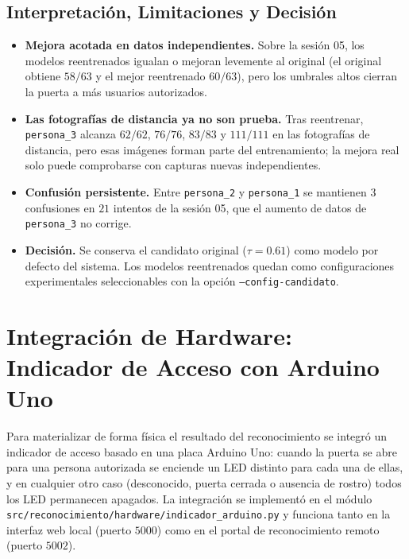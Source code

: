 \documentclass{article}
\begin{document}
\subsection{Interpretación, Limitaciones y Decisión}
\begin{itemize}
    \item \textbf{Mejora acotada en datos independientes.} Sobre la sesión 05, los modelos reentrenados igualan o mejoran levemente al original (el original obtiene $58/63$ y el mejor reentrenado $60/63$), pero los umbrales altos cierran la puerta a más usuarios autorizados.
    \item \textbf{Las fotografías de distancia ya no son prueba.} Tras reentrenar, \texttt{persona\_3} alcanza $62/62$, $76/76$, $83/83$ y $111/111$ en las fotografías de distancia, pero esas imágenes forman parte del entrenamiento; la mejora real solo puede comprobarse con capturas nuevas independientes.
    \item \textbf{Confusión persistente.} Entre \texttt{persona\_2} y \texttt{persona\_1} se mantienen $3$ confusiones en $21$ intentos de la sesión 05, que el aumento de datos de \texttt{persona\_3} no corrige.
    \item \textbf{Decisión.} Se conserva el candidato original ($\tau = 0.61$) como modelo por defecto del sistema. Los modelos reentrenados quedan como configuraciones experimentales seleccionables con la opción \texttt{--config-candidato}.
\end{itemize}

\section{Integración de Hardware: Indicador de Acceso con Arduino Uno}

Para materializar de forma física el resultado del reconocimiento se integró un indicador de acceso basado en una placa Arduino Uno: cuando la puerta se abre para una persona autorizada se enciende un LED distinto para cada una de ellas, y en cualquier otro caso (desconocido, puerta cerrada o ausencia de rostro) todos los LED permanecen apagados. La integración se implementó en el módulo \texttt{src/reconocimiento/hardware/indicador\_arduino.py} y funciona tanto en la interfaz web local (puerto $5000$) como en el portal de reconocimiento remoto (puerto $5002$).
\end{document}
